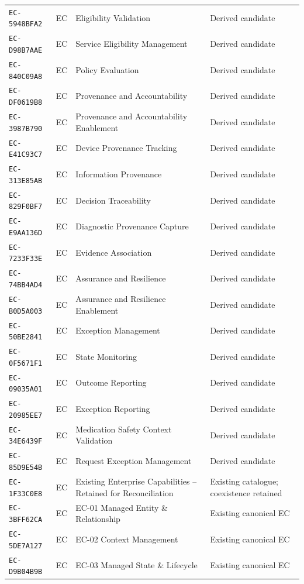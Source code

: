 \documentclass[11pt,a4paper,openany]{book}
\begin{document}
\begin{longtable}{@{}p{.19\linewidth}p{.12\linewidth}p{.39\linewidth}p{.24\linewidth}@{}}
\texttt{EC-5948BFA2} & EC & Eligibility Validation & Derived candidate \\
\texttt{EC-D98B7AAE} & EC & Service Eligibility Management & Derived candidate \\
\texttt{EC-840C09A8} & EC & Policy Evaluation & Derived candidate \\
\texttt{EC-DF0619B8} & EC & Provenance and Accountability & Derived candidate \\
\texttt{EC-3987B790} & EC & Provenance and Accountability Enablement & Derived candidate \\
\texttt{EC-E41C93C7} & EC & Device Provenance Tracking & Derived candidate \\
\texttt{EC-313E85AB} & EC & Information Provenance & Derived candidate \\
\texttt{EC-829F0BF7} & EC & Decision Traceability & Derived candidate \\
\texttt{EC-E9AA136D} & EC & Diagnostic Provenance Capture & Derived candidate \\
\texttt{EC-7233F33E} & EC & Evidence Association & Derived candidate \\
\texttt{EC-74BB4AD4} & EC & Assurance and Resilience & Derived candidate \\
\texttt{EC-B0D5A003} & EC & Assurance and Resilience Enablement & Derived candidate \\
\texttt{EC-50BE2841} & EC & Exception Management & Derived candidate \\
\texttt{EC-0F5671F1} & EC & State Monitoring & Derived candidate \\
\texttt{EC-09035A01} & EC & Outcome Reporting & Derived candidate \\
\texttt{EC-20985EE7} & EC & Exception Reporting & Derived candidate \\
\texttt{EC-34E6439F} & EC & Medication Safety Context Validation & Derived candidate \\
\texttt{EC-85D9E54B} & EC & Request Exception Management & Derived candidate \\
\texttt{EC-1F33C0E8} & EC & Existing Enterprise Capabilities -- Retained for Reconciliation & Existing catalogue; coexistence retained \\
\texttt{EC-3BFF62CA} & EC & EC-01 Managed Entity \& Relationship & Existing canonical EC \\
\texttt{EC-5DE7A127} & EC & EC-02 Context Management & Existing canonical EC \\
\texttt{EC-D9B04B9B} & EC & EC-03 Managed State \& Lifecycle & Existing canonical EC \\

\end{longtable}
\end{document}
